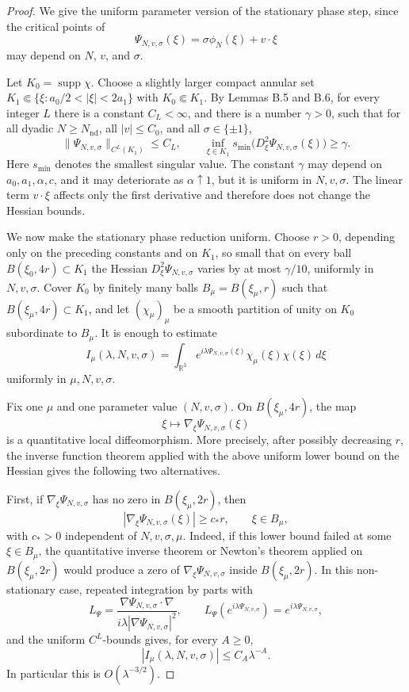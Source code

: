 \documentclass[10pt]{amsart}
\numberwithin{equation}{section}
\theoremstyle{plain}
\theoremstyle{definition}
\theoremstyle{remark}
\begin{document}
\begin{proof}

We give the uniform parameter version of the stationary phase step,
since the critical points of
\[
        \Psi_{N,v,\sigma}(\xi)=\sigma\phi_N(\xi)+v\cdot \xi
\]
may depend on \(N\), \(v\), and \(\sigma\).

Let \(K_0=\operatorname{supp}\chi\). Choose a slightly larger compact annular set
\(K_1\Subset\{\xi: a_0/2<|\xi|<2a_1\}\) with \(K_0\Subset K_1\).
By Lemmas B.5 and B.6, for every integer \(L\) there is a constant
\(C_L<\infty\), and there is a number \(\gamma>0\), such that for all
dyadic \(N\ge N_{\mathrm{nd}}\), all \(|v|\le C_0\), and all
\(\sigma\in\{\pm1\}\),
\[
   \|\Psi_{N,v,\sigma}\|_{C^L(K_1)}\le C_L,
   \qquad
   \inf_{\xi\in K_1} s_{\min}\big(D_\xi^2\Psi_{N,v,\sigma}(\xi)\big)
   \ge \gamma .
\]
Here \(s_{\min}\) denotes the smallest singular value. The constant
\(\gamma\) may depend on \(a_0,a_1,\alpha,c\), and it may deteriorate
as \(\alpha\uparrow1\), but it is uniform in \(N,v,\sigma\). The linear
term \(v\cdot\xi\) affects only the first derivative and therefore does
not change the Hessian bounds.

We now make the stationary phase reduction uniform. Choose \(r>0\),
depending only on the preceding constants and on \(K_1\), so small that
on every ball \(B(\xi_0,4r)\subset K_1\) the Hessian
\(D_\xi^2\Psi_{N,v,\sigma}\) varies by at most \(\gamma/10\), uniformly
in \(N,v,\sigma\). Cover \(K_0\) by finitely many balls
\(B_\mu=B(\xi_\mu,r)\) such that \(B(\xi_\mu,4r)\subset K_1\), and let
\((\chi_\mu)_\mu\) be a smooth partition of unity on \(K_0\) subordinate
to \(B_\mu\). It is enough to estimate
\[
   I_\mu(\lambda,N,v,\sigma)
   =
   \int_{\mathbb R^3}
       e^{i\lambda\Psi_{N,v,\sigma}(\xi)}
       \chi_\mu(\xi)\chi(\xi)\,d\xi
\]
uniformly in \(\mu,N,v,\sigma\).

Fix one \(\mu\) and one parameter value \((N,v,\sigma)\). On
\(B(\xi_\mu,4r)\), the map
\[
        \xi\mapsto \nabla_\xi\Psi_{N,v,\sigma}(\xi)
\]
is a quantitative local diffeomorphism. More precisely, after possibly
decreasing \(r\), the inverse function theorem applied with the above
uniform lower bound on the Hessian gives the following two alternatives.

First, if \(\nabla_\xi\Psi_{N,v,\sigma}\) has no zero in
\(B(\xi_\mu,2r)\), then
\[
       |\nabla_\xi\Psi_{N,v,\sigma}(\xi)|\ge c_* r,
       \qquad \xi\in B_\mu ,
\]
with \(c_*>0\) independent of \(N,v,\sigma,\mu\). Indeed, if this lower
bound failed at some \(\xi\in B_\mu\), the quantitative inverse theorem
or Newton's theorem applied on \(B(\xi_\mu,2r)\) would produce a zero of
\(\nabla_\xi\Psi_{N,v,\sigma}\) inside \(B(\xi_\mu,2r)\). In this
non-stationary case, repeated integration by parts with
\[
       L_{\Psi}
       =
       \frac{\nabla\Psi_{N,v,\sigma}\cdot\nabla}
            {i\lambda|\nabla\Psi_{N,v,\sigma}|^2},
       \qquad
       L_{\Psi}(e^{i\lambda\Psi_{N,v,\sigma}})
       =
       e^{i\lambda\Psi_{N,v,\sigma}},
\]
and the uniform \(C^L\)-bounds gives, for every \(A\ge0\),
\[
       |I_\mu(\lambda,N,v,\sigma)|\le C_A \lambda^{-A}.
\]
In particular this is \(O(\lambda^{-3/2})\).


\end{proof}
\end{document}
